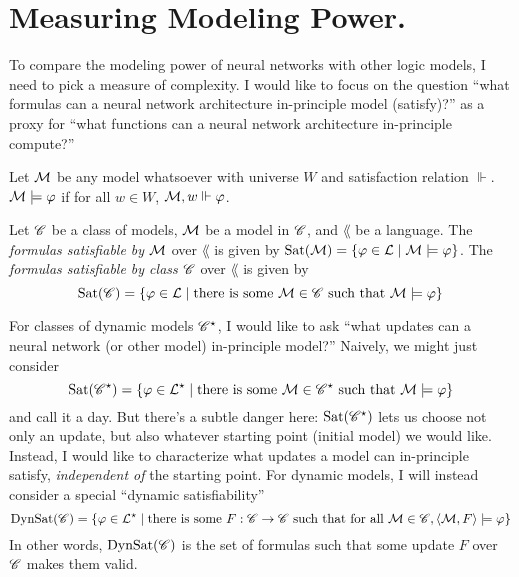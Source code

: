 \documentclass[letterpaper]{article}
\begin{document}
\section*{Measuring Modeling Power.}

To compare the modeling power of neural networks with other logic models, I need to pick a measure of complexity.  I would like to focus on the question ``what formulas can a neural network architecture in-principle model (satisfy)?'' as a proxy for ``what functions can a neural network architecture in-principle compute?''

\begin{definition}
    Let $\mathcal{M}$ be any model whatsoever with universe $W$ and satisfaction relation $\Vdash$.  $\mathcal{M} \models \varphi$ if for all $w \in W$, $\mathcal{M}, w \Vdash \varphi$.
\end{definition}

\begin{definition}
    Let $\mathscr{C}$ be a class of models, $\mathcal{M}$ be a model in $\mathscr{C}$, and $\lang$ be a language.  The \emph{formulas satisfiable by} $\mathcal{M}$ over $\lang$ is given by $\mathrm{Sat}( \mathcal{M} ) = \{ \varphi \in \mathcal{L} \mid \mathcal{M} \models \varphi \}$.  The \emph{formulas satisfiable by class $\mathscr{C}$} over $\lang$ is given by 
    \[
        \mathrm{Sat}( \mathscr{C} ) = \{ \varphi \in \mathcal{L} \mid \textrm{there is some } \mathcal{M} \in \mathscr{C} \textrm{ such that } \mathcal{M} \models \varphi \}
    \]
\end{definition}

For classes of dynamic models $\mathscr{C}^\star$, I would like to ask ``what updates can a neural network (or other model) in-principle model?'' Naively, we might just consider
\[
    \mathrm{Sat}( \mathscr{C}^\star ) = \{ \varphi \in \mathcal{L}^\star \mid \textrm{there is some } \mathcal{M} \in \mathscr{C}^\star \textrm{ such that } \mathcal{M} \models \varphi \}
\]
and call it a day. But there's a subtle danger here: $\mathrm{Sat}( \mathscr{C}^\star )$ lets us choose not only an update, but also whatever starting point (initial model) we would like. Instead, I would like to characterize what updates a model can in-principle satisfy, \emph{independent of} the starting point. For dynamic models, I will instead consider a special ``dynamic satisfiability''
\[
    \mathrm{DynSat}( \mathscr{C} ) = \{ \varphi \in \mathcal{L}^\star \mid \textrm{there is some } F : \mathscr{C} \to \mathscr{C} \textrm{ such that for all } \mathcal{M} \in \mathscr{C}, \langle \mathcal{M}, F \rangle \models \varphi \}
\]
In other words, $\mathrm{DynSat}( \mathscr{C} )$ is the set of formulas such that some update $F$ over $\mathscr{C}$ makes them valid. 
\end{document}
